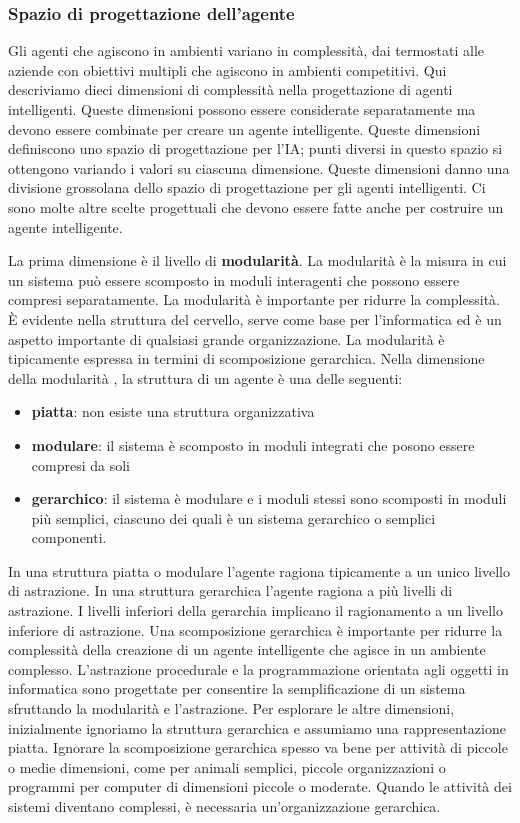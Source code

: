 \documentclass[a4paper]{extarticle}
\begin{document}
\subsubsection{Spazio di progettazione dell'agente}

Gli agenti che agiscono in ambienti variano in complessità, dai termostati alle aziende con obiettivi multipli che agiscono in ambienti competitivi. Qui descriviamo dieci dimensioni di complessità nella progettazione di agenti intelligenti. Queste dimensioni possono essere considerate separatamente ma devono essere combinate per creare un agente intelligente. Queste dimensioni definiscono uno spazio di progettazione per l'IA; punti diversi in questo spazio si ottengono variando i valori su ciascuna dimensione. Queste dimensioni danno una divisione grossolana dello spazio di progettazione per gli agenti intelligenti. Ci sono molte altre scelte progettuali che devono essere fatte anche per costruire un agente intelligente.

La prima dimensione è il livello di \textbf{modularità}. La modularità è la misura in cui un sistema può essere scomposto in moduli interagenti che possono essere compresi separatamente. La modularità è importante per ridurre la complessità. È evidente nella struttura del cervello, serve come base per l'informatica ed è un aspetto importante di qualsiasi grande organizzazione. La modularità è tipicamente espressa in termini di scomposizione gerarchica. Nella dimensione della modularità , la struttura di un agente è una delle seguenti:
\begin{itemize}
\item \textbf{piatta}: non esiste una struttura organizzativa
\item \textbf{modulare}: il sistema è scomposto in moduli integrati che posono essere compresi da soli
\item \textbf{gerarchico}: il sistema è modulare e i moduli stessi sono scomposti in moduli più semplici, ciascuno dei quali è un sistema gerarchico o semplici componenti.
\end{itemize}

In una struttura piatta o modulare l'agente ragiona tipicamente a un unico livello di astrazione. In una struttura gerarchica l'agente ragiona a più livelli di astrazione. I livelli inferiori della gerarchia implicano il ragionamento a un livello inferiore di astrazione. Una scomposizione gerarchica è importante per ridurre la complessità della creazione di un agente intelligente che agisce in un ambiente complesso. L'astrazione procedurale e la programmazione orientata agli oggetti in informatica sono progettate per consentire la semplificazione di un sistema sfruttando la modularità e l'astrazione. Per esplorare le altre dimensioni, inizialmente ignoriamo la struttura gerarchica e assumiamo una rappresentazione piatta. Ignorare la scomposizione gerarchica spesso va bene per attività di piccole o medie dimensioni, come per animali semplici, piccole organizzazioni o programmi per computer di dimensioni piccole o moderate. Quando le attività dei sistemi diventano complessi, è necessaria un'organizzazione gerarchica.
\end{document}
